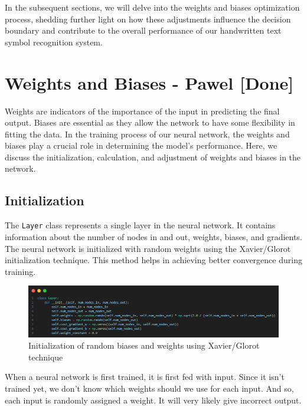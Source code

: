 \documentclass{article}
\begin{document}
In the subsequent sections, we will delve into the weights and biases optimization process, shedding further light on how these adjustments influence the decision boundary and contribute to the overall performance of our handwritten text symbol recognition system.

\newpage
\section{Weights and Biases - Pawel  [Done]}
Weights are indicators of the importance of the input in predicting the final output. Biases are essential as they allow the network to have some flexibility in fitting the data. In the training process of our neural network, the weights and biases play a crucial role in determining the model's performance. Here, we discuss the initialization, calculation, and adjustment of weights and biases in the network. 

\subsection{Initialization}
The \texttt{Layer} class represents a single layer in the neural network. It contains information about the number of nodes in and out, weights, biases, and gradients. The neural network is initialized with random weights using the Xavier/Glorot initialization technique. This method helps in achieving better convergence during training.

\begin{figure}[ht]
    \centering 
    \includegraphics[width=1\textwidth]{images/Xavier-Glorot-initialization-for-weights.png}
    \caption{Initialization of random biases and weights using Xavier/Glorot technique}
    \label{fig:initialized_weights}
\end{figure}

When a neural network is first trained, it is first fed with input. Since it isn't trained yet, we don't know which weights should we use for each input. And so, each input is randomly assigned a weight. It will very likely give incorrect output.
\end{document}
